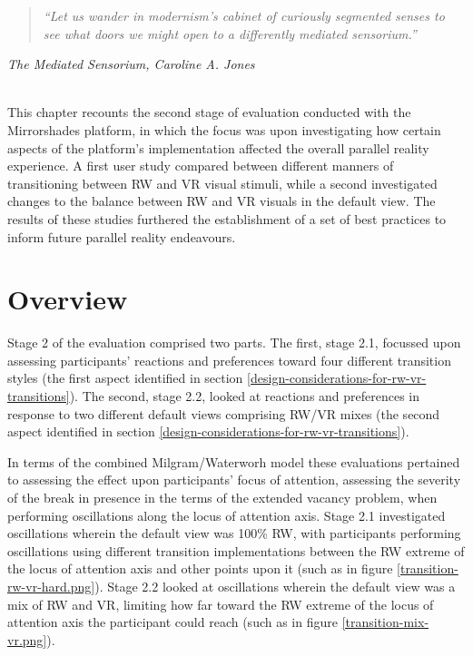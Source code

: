 \begin{quote}
	\textit{``Let us wander in modernism's cabinet of curiously segmented senses to see what doors we might open to a differently mediated sensorium.''}
\end{quote}
\hfill \textit{The Mediated Sensorium, Caroline A. Jones}
\\
\\


\label{chapter-eval-2}

This chapter recounts the second stage of evaluation conducted with the Mirrorshades platform, in which the focus was upon investigating how certain aspects of the platform's implementation affected the overall parallel reality experience. A first user study compared between different manners of transitioning between RW and VR visual stimuli, while a second investigated changes to the balance between RW and VR visuals in the default view. The results of these studies furthered the establishment of a set of best practices to inform future parallel reality endeavours.


\section{Overview}

Stage 2 of the evaluation comprised two parts. The first, stage 2.1, focussed upon assessing participants' reactions and preferences toward four different transition styles (the first aspect identified in section \ref{design-considerations-for-rw-vr-transitions}). The second, stage 2.2, looked at reactions and preferences in response to two different default views comprising RW/VR mixes (the second aspect identified in section \ref{design-considerations-for-rw-vr-transitions}).

In terms of the combined Milgram/Waterworh model these evaluations pertained to assessing the effect upon participants' focus of attention, assessing the severity of the break in presence in the terms of the extended vacancy problem, when performing oscillations along the locus of attention axis. Stage 2.1 investigated oscillations wherein the default view was 100\% RW, with participants performing oscillations using different transition implementations between the RW extreme of the locus of attention axis and other points upon it (such as in figure \ref{transition-rw-vr-hard.png}). Stage 2.2 looked at oscillations wherein the default view was a mix of RW and VR, limiting how far toward the RW extreme of the locus of attention axis the participant could reach (such as in figure \ref{transition-mix-vr.png}).

